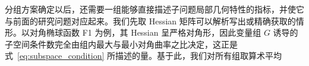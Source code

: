 分组方案确定以后，还需要一组能够直接描述子问题局部几何特性的指标，并使它与前面的研究问题对应起来。我们先取 Hessian 矩阵可以解析写出或精确获取的情形。以对角椭球函数 F1 为例，其 Hessian 呈严格对角形，因此变量组 $G$ 诱导的子空间条件数完全由组内最大与最小对角曲率之比决定，这正是式~\eqref{eq:subspace_condition} 所描述的量。基于此，我们对所有组取算术平均